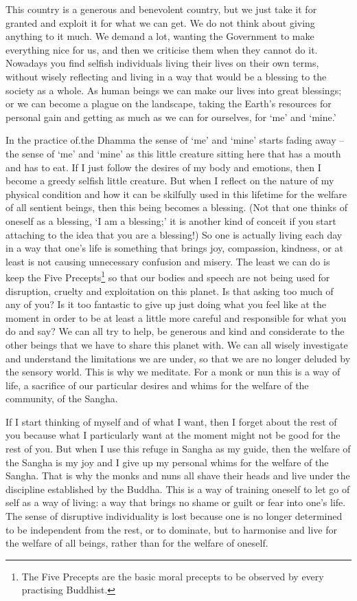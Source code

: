 This country is a generous and benevolent country, but we just take it for granted and exploit it for what we can get. We do not think about giving anything to it much. We demand a lot, wanting the Government to make everything nice for us, and then we criticise them when they cannot do it. Nowadays you find selfish individuals living their lives on their own terms, without wisely reflecting and living in a way that would be a blessing to the society as a whole. As human beings we can make our lives into great blessings; or we can become a plague on the landscape, taking the Earth's resources for personal gain and getting as much as we can for ourselves, for `me' and `mine.'

In the practice of.the Dhamma the sense of `me' and `mine' starts fading away -- the sense of `me' and `mine' as this little creature sitting here that has a mouth and has to eat. If I just follow the desires of my body and emotions, then I become a greedy selfish little creature. But when I reflect on the nature of my physical condition and how it can be skilfully used in this lifetime for the welfare of all sentient beings, then this being becomes a blessing. (Not that one thinks of oneself as a blessing, `I am a blessing;' it is another kind of conceit if you start attaching to the idea that you are a blessing!) So one is actually living each day in a way that one's life is something that brings joy, compassion, kindness, or at least is not causing unnecessary confusion and misery. The least we can do is keep the Five Precepts\footnote{The Five Precepts are the basic moral precepts to be observed by every practising Buddhist.} so that our bodies and speech are not being used for disruption, cruelty and exploitation on this planet. Is that asking too much of any of you? Is it too fantastic to give up just doing what you feel like at the moment in order to be at least a little more careful and responsible for what you do and say? We can all try to help, be generous and kind and considerate to the other beings that we have to share this planet with. We can all wisely investigate and understand the limitations we are under, so that we are no longer deluded by the sensory world. This is why we meditate. For a monk or nun this is a way of life, a sacrifice of our particular desires and whims for the welfare of the community, of the Sangha.

If I start thinking of myself and of what I want, then I forget about the rest of you because what I particularly want at the moment might not be good for the rest of you. But when I use this refuge in Sangha as my guide, then the welfare of the Sangha is my joy and I give up my personal whims for the welfare of the Sangha. That is why the monks and nuns all shave their heads and live under the discipline established by the Buddha. This is a way of training oneself to let go of self as a way of living: a way that brings no shame or guilt or fear into one's life. The sense of disruptive individuality is lost because one is no longer determined to be independent from the rest, or to dominate, but to harmonise and live for the welfare of all beings, rather than for the welfare of oneself.

